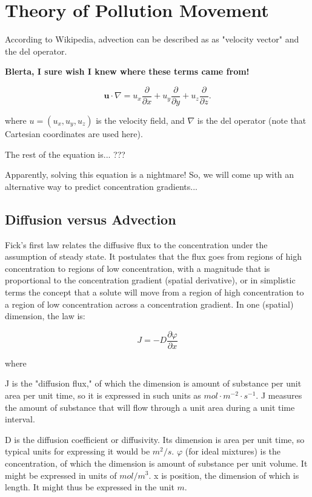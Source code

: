 \documentclass{tufte-handout}\usepackage[]{graphicx}\usepackage[]{color}
\begin{document}
\section{Theory of Pollution Movement}

According to Wikipedia, advection can be described as as "velocity vector" and the del operator.

\textbf{Blerta, I sure wish I knew where these terms came from!}

\begin{equation}
\mathbf{u} \cdot \nabla = u_x \frac{\partial}{\partial x} + u_y \frac{\partial}{\partial y} + u_z \frac{\partial}{\partial z}.
\end{equation}

where $u = (u_x, u_y, u_z)$ is the velocity field, and $\nabla$ is the del operator (note that Cartesian coordinates are used here).

The rest of the equation is... ???

Apparently, solving this equation is a nightmare!  So, we will come up with an alternative way to predict concentration gradients...

\subsection{Diffusion versus Advection}

Fick's first law relates the diffusive flux to the concentration under the assumption of steady state. It postulates that the flux goes from regions of high concentration to regions of low concentration, with a magnitude that is proportional to the concentration gradient (spatial derivative), or in simplistic terms the concept that a solute will move from a region of high concentration to a region of low concentration across a concentration gradient. In one (spatial) dimension, the law is:

\begin{equation}
J=-D{\frac {\partial \varphi }{\partial x}}
\end{equation}

where

J is the "diffusion flux," of which the dimension is amount of substance per unit area per unit time, so it is expressed in such units as $mol\cdot m^{−2}\cdot s^{−1}$. J measures the amount of substance that will flow through a unit area during a unit time interval.

D is the diffusion coefficient or diffusivity. Its dimension is area per unit time, so typical units for expressing it would be $m^2/s$. $\varphi$ (for ideal mixtures) is the concentration, of which the dimension is amount of substance per unit volume. It might be expressed in units of $mol/m^3$.
x is position, the dimension of which is length. It might thus be expressed in the unit $m$.
\end{document}

